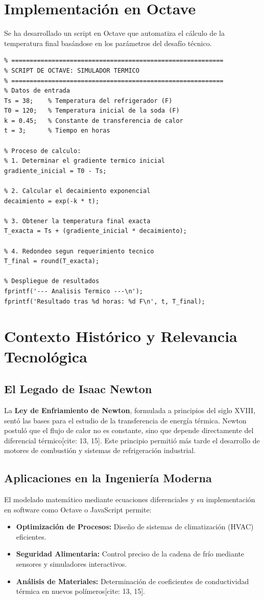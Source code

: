 \documentclass[12pt]{article}
\begin{document}
\section{Implementación en Octave}

Se ha desarrollado un script en Octave que automatiza el cálculo de la temperatura final basándose en los parámetros del desafío técnico.

\begin{lstlisting}
% ==========================================================
% SCRIPT DE OCTAVE: SIMULADOR TERMICO 
% ==========================================================
% Datos de entrada
Ts = 38;    % Temperatura del refrigerador (F)
T0 = 120;   % Temperatura inicial de la soda (F)
k = 0.45;   % Constante de transferencia de calor
t = 3;      % Tiempo en horas

% Proceso de calculo:
% 1. Determinar el gradiente termico inicial
gradiente_inicial = T0 - Ts;

% 2. Calcular el decaimiento exponencial
decaimiento = exp(-k * t);

% 3. Obtener la temperatura final exacta
T_exacta = Ts + (gradiente_inicial * decaimiento);

% 4. Redondeo segun requerimiento tecnico
T_final = round(T_exacta);

% Despliegue de resultados
fprintf('--- Analisis Termico ---\n');
fprintf('Resultado tras %d horas: %d F\n', t, T_final);
\end{lstlisting}
\section{Contexto Histórico y Relevancia Tecnológica}

\subsection{El Legado de Isaac Newton}
La \textbf{Ley de Enfriamiento de Newton}, formulada a principios del siglo XVIII, sentó las bases para el estudio de la transferencia de energía térmica. Newton postuló que el flujo de calor no es constante, sino que depende directamente del diferencial térmico[cite: 13, 15]. Este principio permitió más tarde el desarrollo de motores de combustión y sistemas de refrigeración industrial.

\subsection{Aplicaciones en la Ingeniería Moderna}
El modelado matemático mediante ecuaciones diferenciales y su implementación en software como Octave o JavaScript permite:
\begin{itemize}
    \item \textbf{Optimización de Procesos:} Diseño de sistemas de climatización (HVAC) eficientes.
    \item \textbf{Seguridad Alimentaria:} Control preciso de la cadena de frío mediante sensores y simuladores interactivos.
    \item \textbf{Análisis de Materiales:} Determinación de coeficientes de conductividad térmica en nuevos polímeros[cite: 13, 15].
\end{itemize}
\end{document}
